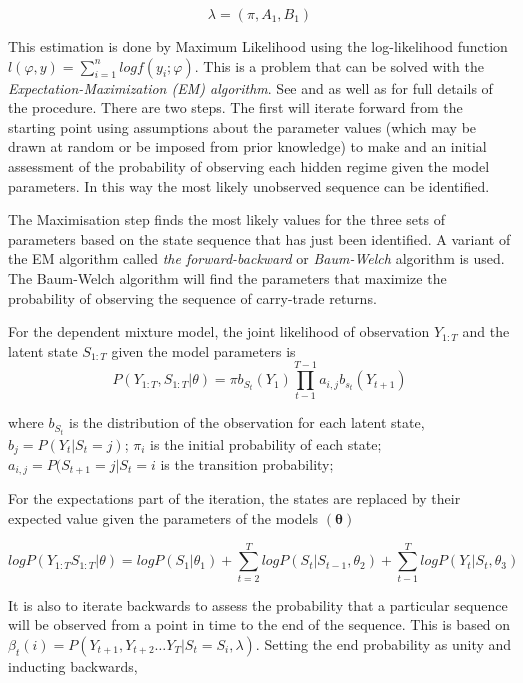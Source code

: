 \documentclass[12pt, a4paper, oneside]{article} %
\begin{document}
\begin{equation}
\lambda = (\pi, A_1, B_1)
\end{equation}

This estimation is done by Maximum Likelihood using the log-likelihood function $l(\varphi, y) = \sum_{i=1}^n log f(y_i; \varphi)$. This is a problem that can be solved with the \emph{Expectation-Maximization (EM) algorithm}.  See \citet{dempster1977maximum} and \citet{Hamilton1989} as well as \citet{depmixS4} for full details of the procedure. There are two steps. The first will iterate forward from the starting point using assumptions about the parameter values (which may be drawn at random or be imposed from prior knowledge) to make and an initial assessment of the probability of observing each hidden regime given the model parameters.  In this way the most likely unobserved sequence can be identified.  

The Maximisation step finds the most likely values for the three sets of parameters based on the state sequence that has just been identified. A variant of the EM algorithm called \emph{the forward-backward} or \emph{Baum-Welch} algorithm \citet{Baum1970} is used.   The Baum-Welch algorithm will find the parameters that maximize the probability of observing the sequence of carry-trade returns.  

For the dependent mixture model, the joint likelihood of observation $Y_{1:T}$ and the latent state $S_{1:T}$ given the model parameters is 
\begin{equation}
P(Y_{1:T}, S_{1:T}|\theta) = \pi b_{S_t}(Y_1)\prod_{t-1}^{T-1} a_{i,j}b_{s_t}(Y_{t+1})
\end{equation}

where $b_{S_t}$ is the distribution of the observation for each latent state, $b_j = P(Y_t|S_t = j)$; $\pi_i$ is the initial probability of each state; $a_{i,j} = P(S_{t+1} = j| S_t = i$ is the transition probability;  

For the expectations part of the iteration, the states are replaced by their expected value given the parameters of the models $(\mathbf{\theta})$

\begin{equation} 
log P(Y_{1:T}S_{1:T}| \theta) = log P(S_1|\theta_1) + \sum_{t=2}^T log P(S_t|S_{t-1}, \theta_2) + \sum_{t-1}^T log P(Y_t|S_t, \theta_3)
\end{equation}

It is also to iterate backwards to assess the probability that a particular sequence will be observed from a point in time to the end of the sequence.  This is based on $\beta_t(i) = P(Y_{t+1}, Y_{t+2}\dots Y_T| S_t = S_i, \lambda)$. Setting the end probability as unity and inducting backwards, 
\end{document}
